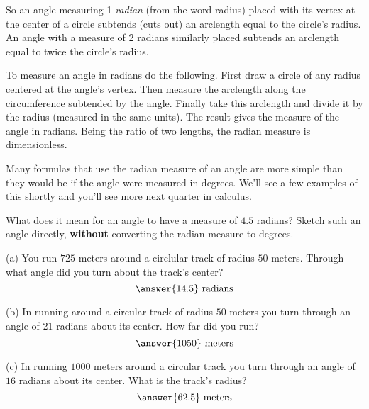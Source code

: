 \documentclass{ximera}
\begin{document}
So an angle measuring 1 \emph{radian} (from the word radius) placed with its vertex at the center of a circle subtends (cuts out) an arclength equal to the circle's radius. An angle with a measure of 2 radians similarly placed subtends an arclength equal to twice the circle's radius. 

To measure an angle in radians do the following. First draw a circle of any radius centered at the angle's vertex. Then measure the arclength along the circumference subtended by the angle. Finally take this arclength and divide it by the radius (measured in the same units). The result gives the measure of the angle in radians. Being the ratio of two lengths, the radian measure is dimensionless.

Many formulas that use the radian measure of an angle are more simple than they would be if the angle were measured in degrees. We'll see a few examples of this shortly and you'll see more next quarter in calculus.


\begin{question} \label{Q1:Radians}
What does it mean for an angle to have a measure of $4.5$ radians? Sketch such an angle directly, {\bf without} converting the radian measure to degrees.
\end{question}


\begin{question} \label{Q01:Radians}
(a) You run $725$ meters around a circlular track of radius $50$ meters. Through what angle did you turn about the track's center?
\[
    \answer{14.5} \text{ radians}
\]

(b) In running around a circular track of radius $50$ meters you turn through an angle of $21$ radians about its center. How far did you run?
\[
    \answer{1050} \text{ meters}
\]

(c) In running $1000$ meters around a circular track you turn through an angle of $16$ radians about its center. What is the track's radius?
\[
   \answer{62.5} \text{ meters}
\]

\end{question}
\end{document}

